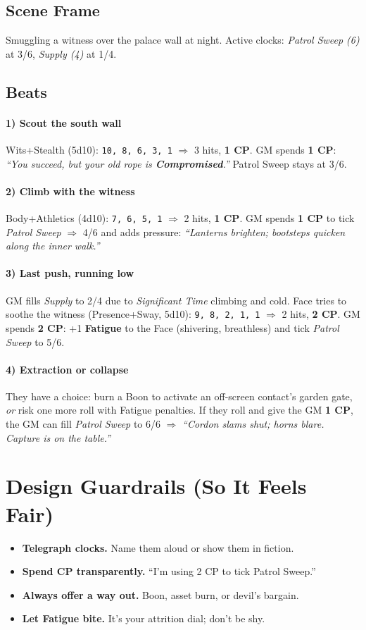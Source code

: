 \documentclass[12pt]{article}
\begin{document}
\subsection*{Scene Frame}
Smuggling a witness over the palace wall at night. Active clocks:
\emph{Patrol Sweep (6)} at 3/6, \emph{Supply (4)} at 1/4.

\subsection*{Beats}
\paragraph{1) Scout the south wall}
Wits+Stealth (5d10): \texttt{10, 8, 6, 3, 1} $\Rightarrow$ 3 hits, \textbf{1 CP}.
GM spends \textbf{1 CP}: \emph{``You succeed, but your old rope is \textbf{Compromised}.''}
Patrol Sweep stays at 3/6.

\paragraph{2) Climb with the witness}
Body+Athletics (4d10): \texttt{7, 6, 5, 1} $\Rightarrow$ 2 hits, \textbf{1 CP}.
GM spends \textbf{1 CP} to tick \emph{Patrol Sweep} $\Rightarrow$ 4/6 and adds pressure:
\emph{``Lanterns brighten; bootsteps quicken along the inner walk.''}

\paragraph{3) Last push, running low}
GM fills \emph{Supply} to 2/4 due to \emph{Significant Time} climbing and cold.
Face tries to soothe the witness (Presence+Sway, 5d10): \texttt{9, 8, 2, 1, 1} $\Rightarrow$ 2 hits, \textbf{2 CP}.
GM spends \textbf{2 CP}: +1 \textbf{Fatigue} to the Face (shivering, breathless) and tick \emph{Patrol Sweep} to 5/6.

\paragraph{4) Extraction or collapse}
They have a choice: burn a Boon to activate an off-screen contact’s garden gate, \emph{or} risk one more roll with Fatigue penalties. If they roll and give the GM \textbf{1 CP}, the GM can fill \emph{Patrol Sweep} to 6/6 $\Rightarrow$ \emph{``Cordon slams shut; horns blare. Capture is on the table.''}

\section{Design Guardrails (So It Feels Fair)}
\begin{itemize}
  \item \textbf{Telegraph clocks.} Name them aloud or show them in fiction.
  \item \textbf{Spend CP transparently.} ``I'm using 2 CP to tick Patrol Sweep.''
  \item \textbf{Always offer a way out.} Boon, asset burn, or devil’s bargain.
  \item \textbf{Let Fatigue bite.} It's your attrition dial; don't be shy.
\end{itemize}
\end{document}
